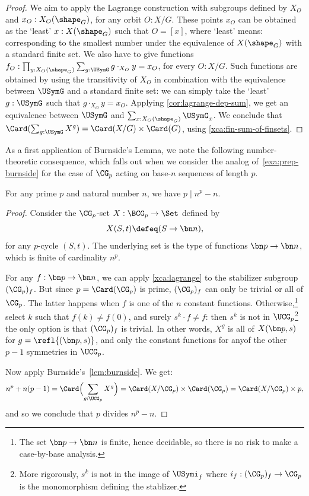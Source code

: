 \begin{proof}
  We aim to apply the Lagrange construction with subgroups 
  defined by $X_O$ and
  $x_O : X_O(\sh_G)$, for any orbit $O:X/G$. These points $x_O$ can
  be obtained as the `least' $x:X(\sh_G)$ such that $O=[x]$,
  where `least' means: corresponding to the smallest number under the
  equivalence of $X(\sh_G)$ with a standard finite set.
  We also have to give functions
  $f_O : \prod_{y:X_O(\sh_G)}\sum_{g:\USymG} g\cdot_{X_O} y = x_O$,
  for every $O:X/G$.
  Such functions are obtained by using the transitivity of $X_O$
  in combination with the equivalence between $\USymG$ and a 
  standard finite set: we can simply take the `least' $g:\USymG$
  such that $g\cdot_{X_O} y = x_O$.
  Applying \cref{cor:lagrange-dep-sum},
  we get an equivalence between $\USymG$ and $\sum_{x : X_O(\sh_G)} \USymG_x$. 
  We conclude that $\Card(\sum_{g:\USymG} X^g) = \Card(X/G) \times \Card(G)$,
  using \cref{xca:fin-sum-of-finsets}.
\end{proof}

As a first application of Burnside's Lemma, we note the following
number-theoretic consequence, which falls out when we consider
the analog of~\cref{exa:prep-burnside} for the case of $\CG_p$ acting
on base-$n$ sequences of length $p$.

\begin{theorem}
  For any prime $p$ and natural number $n$, we have $p \mid {n^p-n}$.
\end{theorem}
\begin{proof}
  Consider the $\CG_p$-set $X : \BCG_p \to \Set$ defined by
  \[
    X(S,t) \defeq (S \to \bn n),
  \]
  for any $p$-cycle $(S,t)$. The underlying set is the type of functions
  $\bn p \to \bn n$, which is finite of cardinality $n^p$.


  For any $f : \bn p \to \bn n$, we can apply \cref{xca:lagrange} to the
  stabilizer subgroup $(\CG_p)_f$. But since $p = \Card(\CG_p)$ is prime,
  $(\CG_p)_f$ can only be trivial or all of $\CG_p$. The latter happens when $f$
  is one of the $n$ constant functions. Otherwise,\footnote{The set
    $\bn p \to \bn n$ is finite, hence decidable, so there is no risk to make a
    case-by-base analysis.} select $k$ such that $f(k) \neq f(0)$, and surely
  $s^k \cdot f \neq f$: then $s^k$ is not in $\UCG_p$\footnote{More rigorously,
    $s^k$ is not in the image of $\USymi_f$ where $i_f: (\CG_p)_f \to \CG_p$ is the
    monomorphism defining the stablizer.} the only option is that $(\CG_p)_f$ is
  trivial. In other words, $X^g$ is all of $X(\bn p,s)$ for
  $g = \refl{(\bn p, s)}$, and only the constant functions for anyof the other
  $p-1$ symmetries in $\UCG_p$.
  
  Now apply Burnside's~\cref{lem:burnside}. We get:
  \[
    n^p + n(p-1) = \Card\Bigl(\sum_{g:\UCG_p} X^g\Bigr) = \Card(X/\CG_p) \times
    \Card(\CG_p) = \Card(X/\CG_p) \times p,
  \]
  and so we conclude that $p$ divides $n^p-n$.
\end{proof}



